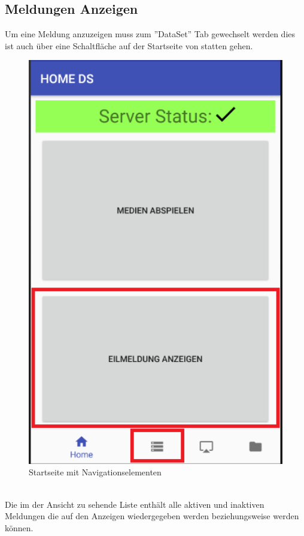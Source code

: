 \subsection{Meldungen Anzeigen}
Um eine Meldung anzuzeigen muss zum ''DataSet'' Tab gewechselt werden dies ist auch über eine Schaltfläche auf der Startseite von statten gehen.
\begin{figure}[H]
\centering
\includegraphics[width=1.0\textwidth]{images/06_AndroidApp/06_dataSetNavigation}
\caption{Startseite mit Navigationselementen}
\label{fig:mediaNav}
\end{figure}
\\
Die im der Ansicht zu sehende Liste enthält alle aktiven und  inaktiven Meldungen die auf den Anzeigen wiedergegeben werden beziehungsweise werden können. 
